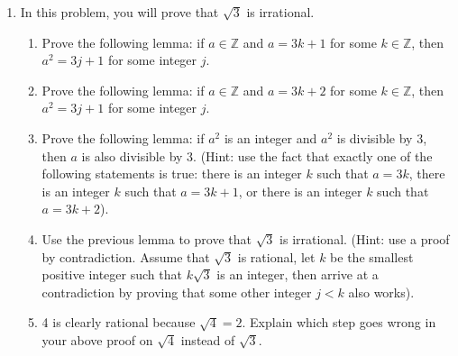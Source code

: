 \documentclass{article}
\begin{document}
\begin{enumerate}
    \item In this problem, you will prove that $\sqrt{3}$ is irrational.
    \begin{enumerate}
        \item Prove the following lemma: if $a \in \mathbb{Z}$ and $a = 3k + 1$ for some $k \in \mathbb{Z}$, then $a^2 = 3j + 1$ for some integer $j$.
        \item Prove the following lemma: if $a \in \mathbb{Z}$ and $a = 3k + 2$ for some $k \in \mathbb{Z}$, then $a^2 = 3j + 1$ for some integer $j$.
        \item Prove the following lemma: if $a^2$ is an integer and $a^2$ is divisible by 3, then $a$ is also divisible by 3. (Hint: use the fact that exactly one of the following statements is true: there is an integer $k$ such that $a = 3k$, there is an integer $k$ such that $a = 3k + 1$, or there is an integer $k$ such that $a = 3k + 2$).
        \item Use the previous lemma to prove that $\sqrt{3}$ is irrational. (Hint: use a proof by contradiction. Assume that $\sqrt{3}$ is rational, let $k$ be the smallest positive integer such that $k\sqrt{3}$ is an integer, then arrive at a contradiction by proving that some other integer $j < k$ also works). 
        \item 4 is clearly rational because $\sqrt{4} = 2$. Explain which step goes wrong in your above proof on $\sqrt{4}$ instead of $\sqrt{3}$.
    \end{enumerate}
        
    
\end{enumerate}
\end{document}
